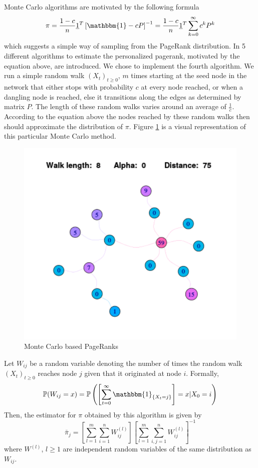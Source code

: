 \documentclass[twocolumn]{article}
\theoremstyle{definition}
\theoremstyle{theorem}
\begin{document}
\noindent Monte Carlo algorithms are motivated by the following formula
\[
\pi = \frac{1-c}{n}\underline{1}^T\left[\mathbbm{1} - cP\right]^{-1} = \frac{1-c}{n}\underline{1}^{T}\sum_{k=0}^{\infty}c^kP^k 
\]
\noindent which suggests a simple way of sampling from the PageRank distribution. In \cite{Monte Carlo methods in PageRank computation: When one iteration is sufficient} 5 different algorithms to estimate the personalized pagerank, motivated by the equation above, are introduced. We chose to implement the fourth algorithm. We run a simple random walk $(X_t)_{t\geq{}0}$, $m$ times starting at the seed node in the network that either stops with probability $c$ at every node reached, or when a dangling node is reached, else it transitions along the edges as determined by matrix $P$. The length of these random walks varies around an average of $\frac{1}{c}$. According to the equation above the nodes reached by these random walks then should approximate the distribution of $\pi$. Figure  \ref{fig:RandomWalks} is a visual representation of this particular Monte Carlo method.
\begin{figure}
\includegraphics[scale=0.6]{PageRank}
\caption{Monte Carlo based PageRanks}
\label{fig:RandomWalks}
\end{figure}
Let $W_{ij}$ be a random variable denoting the number of times the random walk $(X_t)_{t\geq 0}$ reaches node $j$ given that it originated at node $i$. Formally,
\[ \mathbb{P}(W_{ij} = x) = \mathbb{P}\left(\left[\sum_{t=0}^{\infty}\mathbbm{1}_{\left\lbrace X_t=j\right\rbrace}\right]=x|X_0=i\right)
\]
Then, the estimator for $\pi$ obtained by this algorithm is given by
\[ 
\bar{\pi}_j = \left[\sum_{l=1}^{m}\sum_{i=1}^{n}W^{(l)}_{ij}\right]\left[\sum_{l=1}^{m}\sum_{i,j=1}^{n}W^{(l)}_{ij}\right]^{-1} 
\]
where $W^{(l)}$, $l\geq{}1$ are independent random variables of the same distribution as $W_{ij}$.\vspace{1em}\\
\end{document}
